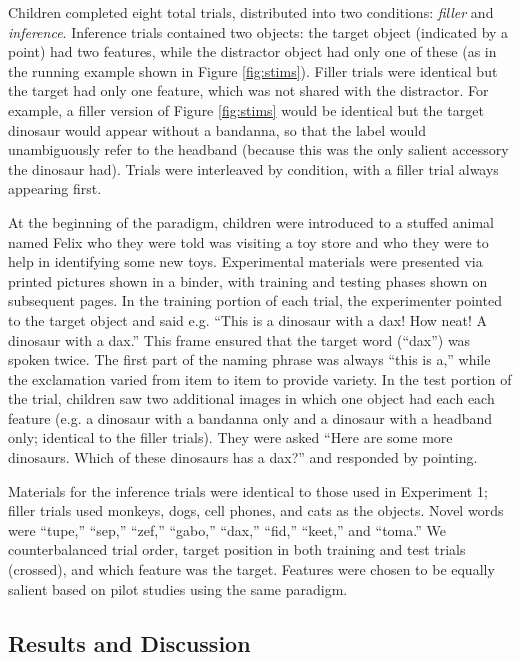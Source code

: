 \documentclass[review]{elsarticle}
\begin{document}
Children completed eight total trials, distributed into two conditions: \emph{filler} and \emph{inference}. Inference trials contained two objects: the target object (indicated by a point) had two features, while the distractor object had only one of these (as in the running example shown in Figure \ref{fig:stims}). Filler trials were identical but the target had only one feature, which was not shared with the distractor. For example, a filler version of Figure \ref{fig:stims} would be identical but the target dinosaur would appear without a bandanna, so that the label would unambiguously refer to the headband (because this was the only salient accessory the dinosaur had). Trials were interleaved by condition, with a filler trial always appearing first. 

At the beginning of the paradigm, children were introduced to a stuffed animal named Felix who they were told was visiting a toy store and who they were to help in identifying some new toys. Experimental materials were presented via printed pictures shown in a binder, with training and testing phases shown on subsequent pages. In the training portion of each trial, the experimenter pointed to the target object and said e.g. ``This is a dinosaur with a dax! How neat! A dinosaur with a dax.'' This frame ensured that the target word (``dax'') was spoken twice. The first part of the naming phrase was always ``this is a,'' while the exclamation varied from item to item to provide variety. In the test portion of the trial, children saw two additional images in which one object had each each feature (e.g. a dinosaur with a bandanna only and a dinosaur with a headband only; identical to the filler trials). They were asked ``Here are some more dinosaurs. Which of these dinosaurs has a dax?'' and responded by pointing. 

Materials for the inference trials were identical to those used in Experiment 1; filler trials used monkeys, dogs, cell phones, and cats as the objects. Novel words were ``tupe,'' ``sep,'' ``zef,'' ``gabo,'' ``dax,'' ``fid,'' ``keet,'' and ``toma.'' We counterbalanced trial order, target position in both training and test trials (crossed), and which feature was the target. Features were chosen to be equally salient based on pilot studies using the same paradigm.


\subsection{Results and Discussion}
\end{document}
